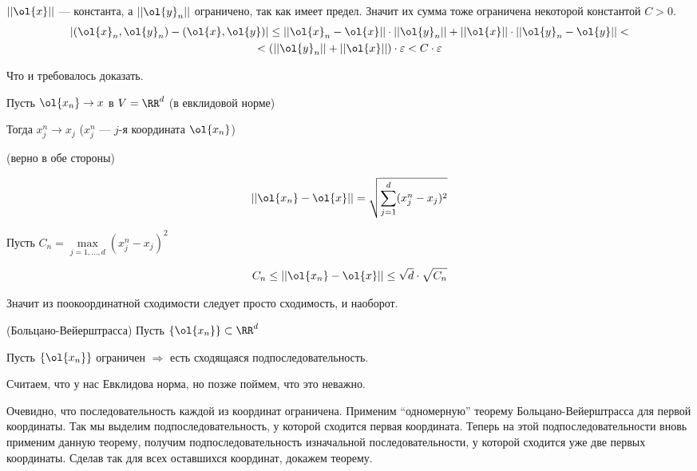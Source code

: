 \( || \ol{x} || \) --- константа, а \( || \ol{y}_n || \) ограничено, так как имеет предел.
Значит их сумма тоже ограничена некоторой константой \( C > 0 \).
\begin{gather*}
    | (\ol{x}_n, \ol{y}_n) - (\ol{x}, \ol{y}) |
    \leq
    || \ol{x}_n - \ol{x} || \cdot || \ol{y}_n || + || \ol{x} || \cdot || \ol{y}_n - \ol{y} ||
    <
    \\
    <
    ( || \ol{y}_n || + || \ol{x} || ) \cdot \varepsilon
    <
    C \cdot \varepsilon
\end{gather*}

Что и требовалось доказать.

\begin{thrm}{}{}
    Пусть \( \ol{x_n} \to x \) в \( V = \RR^d \) (в евклидовой норме)

    Тогда \( x_j^n \to x_j \) (\( x_j^n \) --- \( j \)-я координата \( \ol{x_n} \))

    (верно в обе стороны)
\end{thrm}

\[
    || \ol{x_n} - \ol{x} || = \sqrt{\sum\limits_{j = 1}^{d} (x_j^n - x_j)^2}
\]

Пусть \( C_n = \max\limits_{j = 1, \ldots, d} (x_j^n - x_j)^2 \)

\[
    C_n \leq || \ol{x_n} - \ol{x} || \leq \sqrt{d} \cdot \sqrt{C_n}
\]

Значит из поокоординатной сходимости следует просто сходимость, и наоборот.

\begin{thrm}{(Больцано-Вейерштрасса)}{}
    Пусть \( \{ \ol{x_n} \} \subset \RR^d \)

    Пусть \( \{ \ol{x_n} \} \) ограничен \( \Rightarrow \) есть сходящаяся подпоследовательность.

    Считаем, что у нас Евклидова норма, но позже поймем, что это неважно.
\end{thrm}

Очевидно, что последовательность каждой из координат ограничена.
Применим ``одномерную'' теорему Больцано-Вейерштрасса для первой координаты.
Так мы выделим подпоследовательность, у которой сходится первая координата.
Теперь на этой подпоследовательности вновь применим данную теорему,
получим подпоследовательность изначальной последовательности,
у которой сходится уже две первых координаты.
Сделав так для всех оставшихся координат, докажем теорему.

